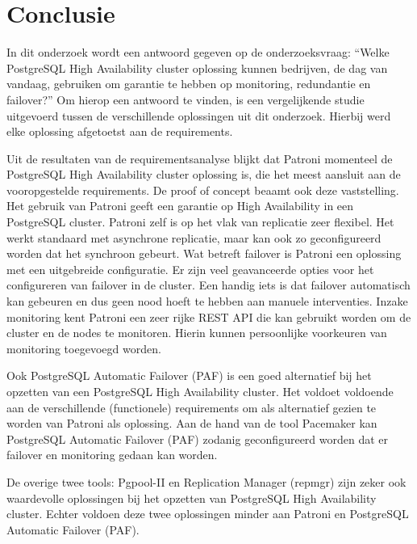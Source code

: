 
\chapter{Conclusie}
\label{ch:conclusie}

In dit onderzoek wordt een antwoord gegeven op de onderzoeksvraag: “Welke PostgreSQL High Availability cluster oplossing kunnen bedrijven, de dag van vandaag, gebruiken om garantie te hebben op monitoring, redundantie en failover?” Om hierop een antwoord te vinden, is een vergelijkende studie uitgevoerd tussen de verschillende oplossingen uit dit onderzoek. Hierbij werd elke oplossing afgetoetst aan de requirements.

Uit de resultaten van de requirementsanalyse blijkt dat Patroni momenteel de PostgreSQL High Availability cluster oplossing is, die het meest aansluit aan de vooropgestelde requirements. De proof of concept beaamt ook deze vaststelling. Het gebruik van Patroni geeft een garantie op High Availability in een PostgreSQL cluster. Patroni zelf is op het vlak van replicatie zeer flexibel. Het werkt standaard met asynchrone replicatie, maar kan ook zo geconfigureerd worden dat het synchroon gebeurt. Wat betreft failover is Patroni een oplossing met een uitgebreide configuratie. Er zijn veel geavanceerde opties voor het configureren van failover in de cluster. Een handig iets is dat failover automatisch kan gebeuren en dus geen nood hoeft te hebben aan manuele interventies. Inzake monitoring kent Patroni een zeer rijke REST API die kan gebruikt worden om de cluster en de nodes te monitoren. Hierin kunnen persoonlijke voorkeuren van monitoring toegevoegd worden.

Ook PostgreSQL Automatic Failover (PAF) is een goed alternatief bij het opzetten van een PostgreSQL High Availability cluster. Het voldoet voldoende aan de verschillende (functionele) requirements om als alternatief gezien te worden van Patroni als oplossing. Aan de hand van de tool Pacemaker kan PostgreSQL Automatic Failover (PAF) zodanig geconfigureerd worden dat er failover en monitoring gedaan kan worden.

De overige twee tools: Pgpool-II en Replication Manager (repmgr) zijn zeker ook waardevolle oplossingen bij het opzetten van PostgreSQL High Availability cluster. Echter voldoen deze twee oplossingen minder aan Patroni en PostgreSQL Automatic Failover (PAF). 

